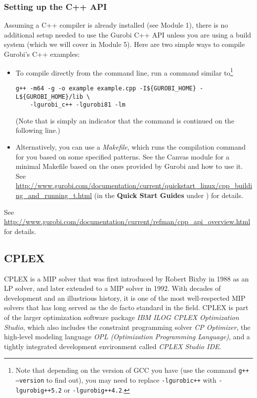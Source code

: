 \documentclass[12pt]{article}
\begin{document}
\subsubsection{Setting up the C++ API}
Assuming a C++ compiler is already installed (see Module 1), there is no additional setup needed to use the Gurobi C++ API unless you are using a build system (which we will cover in Module 5).
Here are two simple ways to compile Gurobi's C++ examples:
\begin{itemize}
    \item To compile directly from the command line, run a command similar to\footnote{
        Note that depending on the version of GCC you have (use the command \texttt{g++ --version} to find out), you may need to replace \texttt{-lgurobi\ttul c++} with \texttt{-lgurobi\ttul g++5.2} or \texttt{-lgurobi\ttul g++4.2}.
        }
\begin{verbatim}
g++ -m64 -g -o example example.cpp -I${GUROBI_HOME} -L${GUROBI_HOME}/lib \
    -lgurobi_c++ -lgurobi81 -lm
\end{verbatim}
        (Note that \texttt{} is simply an indicator that the command is continued on the following line.)
    \item Alternatively, you can use a \emph{Makefile}, which runs the compilation command for you based on some specified patterns.
        See the Canvas module for a minimal Makefile based on the ones provided by Gurobi and how to use it.
        See \url{http://www.gurobi.com/documentation/current/quickstart_linux/cpp_building_and_running_t.html} (in the \textbf{Quick Start Guides} under ) for details.
\end{itemize}
See \url{http://www.gurobi.com/documentation/current/refman/cpp_api_overview.html} for details.



\subsection{CPLEX}
CPLEX is a MIP solver that was first introduced by Robert Bixby in 1988 as an LP solver, and later extended to a MIP solver in 1992.
With decades of development and an illustrious history, it is one of the most well-respected MIP solvers that has long served as the de facto standard in the field.
CPLEX is part of the larger optimization software package \textit{IBM ILOG CPLEX Optimization Studio}, which also includes the constraint programming solver \textit{CP Optimizer}, the high-level modeling language \textit{OPL (Optimization Programming Language)}, and a tightly integrated development environment called \textit{CPLEX Studio IDE}.
\end{document}
